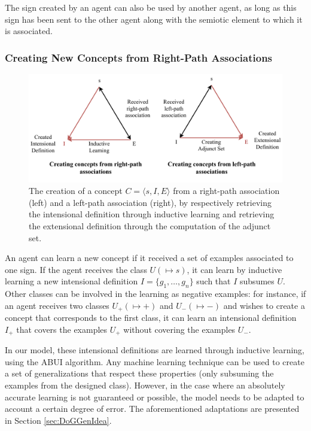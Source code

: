 The sign created by an agent can also be used by another agent, as long as this sign has been sent to the other agent along with the semiotic element to which it is associated.

\subsubsection{Creating New Concepts from Right-Path Associations}
\label{sec:funCreaConE}

\begin{figure}[t]
    \centering
    \includegraphics[width=\textwidth]{figs/ConceptCreation.pdf}
    \caption{The creation of a concept $C = \langle s,I,E \rangle$ from a right-path association (left) and a left-path association (right), by respectively retrieving the intensional definition through inductive learning and retrieving the extensional definition through the computation of the adjunct set.}
    \label{fig:ConCrea}
\end{figure}

An agent can learn a new concept if it received a set of examples associated to one sign. If the agent receives the class $U(\mapsto s)$, it can learn by inductive learning a new intensional definition $I = \{g_{1}, \ldots, g_{n}\}$ such that $I$ subsumes $U$. Other classes can be involved in the learning as negative examples: for instance, if an agent receives two classes $U_{+}(\mapsto +)$ and $U_{-}(\mapsto -)$ and wishes to create a concept that corresponds to the first class, it can learn an intensional definition $I_{+}$ that covers the examples $U_{+}$ without covering the examples $U_{-}$.

In our model, these intensional definitions are learned through inductive learning, using the ABUI algorithm. Any machine learning technique can be used to create a set of generalizations that respect these properties (only subsuming the examples from the designed class). However, in the case where an absolutely accurate learning is not guaranteed or possible, the model needs to be adapted to account a certain degree of error. The aforementioned adaptations are presented in Section \ref{sec:DoGGenIdea}.

